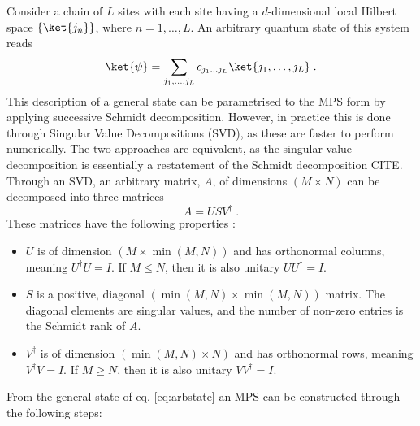 Consider a chain of $L$ sites with each site having a $d$-dimensional local Hilbert space $\{ \ket{j_n} \}$, where $n = 1, \ldots, L$. An arbitrary quantum state of this system reads
\begin{equation}
	\ket{\psi} = \sum_{j_1, \ldots, j_L} c_{j_1 \ldots j_L} \ket{j_1, \ldots, j_L} \; .
	\label{eq:arbstate}
\end{equation}
This description of a general state can be parametrised to the MPS form by applying successive Schmidt decomposition. However, in practice this is done through Singular Value Decompositions (SVD), as these are faster to perform numerically. The two approaches are equivalent, as the singular value decomposition is essentially a restatement of the Schmidt decomposition CITE.
Through an SVD, an arbitrary matrix, $A$, of dimensions $(M \times N)$ can be decomposed into three matrices
\begin{equation}
	A = U S V^{\dag} \; .
\end{equation}
These matrices have the following properties \cite{schollwock}:
\begin{itemize}
\item
$U$ is of dimension $(M \times \min(M,N))$ and has orthonormal columns, meaning $U^{\dag}U = I$. If $M \leq N$, then it is also unitary $U U^{\dag} = I$.

\item
$S$ is a positive, diagonal $(\min(M,N) \times \min(M,N))$ matrix. The diagonal elements are singular values, and the number of non-zero entries is the Schmidt rank of $A$.

\item
$V^{\dag}$ is of dimension $(\min(M,N) \times N)$ and has orthonormal rows, meaning $V^{\dag}V = I$. If $M \geq N$, then it is also unitary $V V^{\dag} = I$.
\end{itemize} 
From the general state of eq. \eqref{eq:arbstate} an MPS can be constructed through the following steps:
